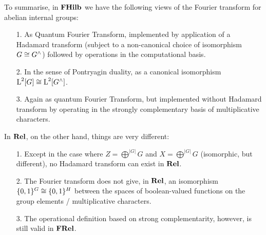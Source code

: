To summarise, in $\mathbf{FHilb}$ we have the following views of the Fourier transform for abelian internal groups:
\begin{enumerate}
\item[1.] As Quantum Fourier Transform, implemented by application of a Hadamard transform (subject to a non-canonical choice of isomorphism $G \cong G^\wedge$) followed by operations in the computational basis.
\item[2.] In the sense of Pontryagin duality, as a canonical isomorphism $\operatorname{L}^2[G] \cong \operatorname{L}^2[G^\wedge]$.
\item[3.] Again as quantum Fourier Transform, but implemented without Hadamard transform by operating in the strongly complementary basis of multiplicative characters.
\end{enumerate}

In $\mathbf{Rel}$, on the other hand, things are very different:
\begin{enumerate}
\item[1.] Except in the case where $Z = \bigoplus^{|G|}G$ and $X = \bigoplus^{|G|}G$ (isomorphic, but different), no Hadamard transform can exist in $\mathbf{Rel}$.
\item[2.] The Fourier transform does not give, in $\mathbf{Rel}$, an isomorphism $\{0,1\}^G \cong \{0,1\}^H$ between the spaces of boolean-valued functions on the group elements / multiplicative characters.
\item[3.] The operational definition based on strong complementarity, however, is still valid in $\mathbf{FRel}$. 
\end{enumerate}





